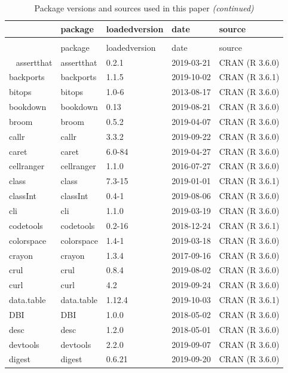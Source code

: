 \documentclass[]{article}
\begin{document}
\begin{longtable}[t]{lllll}
\caption{\label{tab:pkg-info}Package versions and sources used in this paper}\\
\toprule
  & package & loadedversion & date & source\\
\midrule
\endfirsthead
\caption[]{\label{tab:pkg-info}Package versions and sources used in this paper \textit{(continued)}}\\
\toprule
  & package & loadedversion & date & source\\
\midrule
\endhead
\
\endfoot
\bottomrule
\endlastfoot
assertthat & assertthat & 0.2.1 & 2019-03-21 & CRAN (R 3.6.0)\\
backports & backports & 1.1.5 & 2019-10-02 & CRAN (R 3.6.1)\\
bitops & bitops & 1.0-6 & 2013-08-17 & CRAN (R 3.6.0)\\
bookdown & bookdown & 0.13 & 2019-08-21 & CRAN (R 3.6.0)\\
broom & broom & 0.5.2 & 2019-04-07 & CRAN (R 3.6.0)\\
\addlinespace
callr & callr & 3.3.2 & 2019-09-22 & CRAN (R 3.6.0)\\
caret & caret & 6.0-84 & 2019-04-27 & CRAN (R 3.6.0)\\
cellranger & cellranger & 1.1.0 & 2016-07-27 & CRAN (R 3.6.0)\\
class & class & 7.3-15 & 2019-01-01 & CRAN (R 3.6.1)\\
classInt & classInt & 0.4-1 & 2019-08-06 & CRAN (R 3.6.0)\\
\addlinespace
cli & cli & 1.1.0 & 2019-03-19 & CRAN (R 3.6.0)\\
codetools & codetools & 0.2-16 & 2018-12-24 & CRAN (R 3.6.1)\\
colorspace & colorspace & 1.4-1 & 2019-03-18 & CRAN (R 3.6.0)\\
crayon & crayon & 1.3.4 & 2017-09-16 & CRAN (R 3.6.0)\\
crul & crul & 0.8.4 & 2019-08-02 & CRAN (R 3.6.0)\\
\addlinespace
curl & curl & 4.2 & 2019-09-24 & CRAN (R 3.6.0)\\
data.table & data.table & 1.12.4 & 2019-10-03 & CRAN (R 3.6.1)\\
DBI & DBI & 1.0.0 & 2018-05-02 & CRAN (R 3.6.0)\\
desc & desc & 1.2.0 & 2018-05-01 & CRAN (R 3.6.0)\\
devtools & devtools & 2.2.0 & 2019-09-07 & CRAN (R 3.6.0)\\
\addlinespace
digest & digest & 0.6.21 & 2019-09-20 & CRAN (R 3.6.0)\\

\end{longtable}
\end{document}
